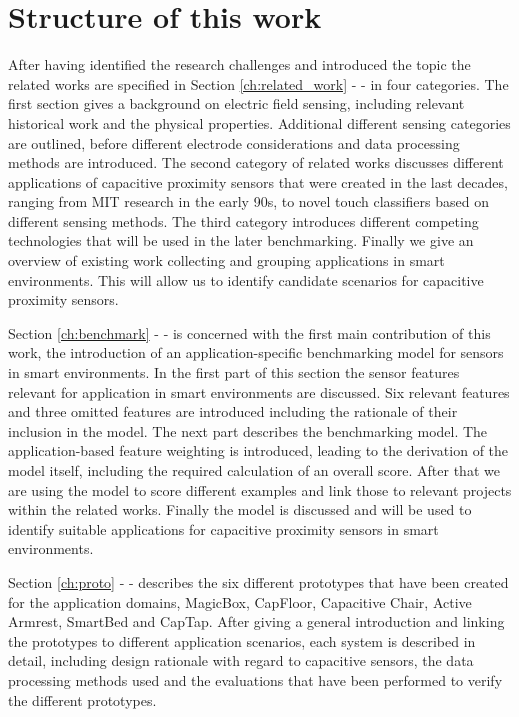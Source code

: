 \section{Structure of this work}
After having identified the research challenges and introduced the topic the related works are specified in Section \ref{ch:related_work} - \emph{} - in four categories. The first section gives a background on electric field sensing, including relevant historical work and the physical properties. Additional different sensing categories are outlined, before different electrode considerations and data processing methods are introduced. The second category of related works discusses different applications of capacitive proximity sensors that were created in the last decades, ranging from MIT research in the early 90s, to novel touch classifiers based on different sensing methods. The third category introduces different competing technologies that will be used in the later benchmarking. Finally we give an overview of existing work collecting and grouping applications in smart environments. This will allow us to identify candidate scenarios for capacitive proximity sensors.

Section \ref{ch:benchmark} - \emph{} - is concerned with the first main contribution of this work, the introduction of an application-specific benchmarking model for sensors in smart environments. In the first part of this section the sensor features relevant for application in smart environments are discussed. Six relevant features and three omitted features are introduced including the rationale of their inclusion in the model. The next part describes the benchmarking model. The application-based feature weighting is introduced, leading to the derivation of the model itself, including the required calculation of an overall score. After that we are using the model to score different examples and link those to relevant projects within the related works. Finally the model is discussed and will be used to identify suitable applications for capacitive proximity sensors in smart environments.

Section \ref{ch:proto} - \emph{} - describes the six different prototypes that have been created for the application domains, MagicBox, CapFloor, Capacitive Chair,  Active Armrest, SmartBed and CapTap. After giving a general introduction and linking the prototypes to different application scenarios, each system is described in detail, including design rationale with regard to capacitive sensors, the data processing methods used and the evaluations that have been performed to verify the different prototypes.

